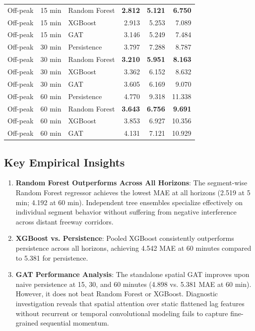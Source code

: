 \documentclass[conference]{IEEEtran}
\begin{document}
\begin{table}[htbp]
{\begin{tabular}{lllrrr}
Off-peak & 15 min & Random Forest & \textbf{2.812} & \textbf{5.121} & \textbf{6.750} \\
Off-peak & 15 min & XGBoost       & 2.913 & 5.253 & 7.089 \\
Off-peak & 15 min & GAT           & 3.146 & 5.249 & 7.484 \\
\midrule
Off-peak & 30 min & Persistence   & 3.797 & 7.288 & 8.787 \\
Off-peak & 30 min & Random Forest & \textbf{3.210} & \textbf{5.951} & \textbf{8.163} \\
Off-peak & 30 min & XGBoost       & 3.362 & 6.152 & 8.632 \\
Off-peak & 30 min & GAT           & 3.605 & 6.169 & 9.070 \\
\midrule
Off-peak & 60 min & Persistence   & 4.770 & 9.318 & 11.338 \\
Off-peak & 60 min & Random Forest & \textbf{3.643} & \textbf{6.756} & \textbf{9.691} \\
Off-peak & 60 min & XGBoost       & 3.853 & 6.927 & 10.356 \\
Off-peak & 60 min & GAT           & 4.131 & 7.121 & 10.929 \\
\bottomrule
\end{tabular}%
}
\end{table}

\subsection{Key Empirical Insights}
\begin{enumerate}
    \item \textbf{Random Forest Outperforms Across All Horizons}: The segment-wise Random Forest regressor achieves the lowest MAE at all horizons (2.519 at 5 min; 4.192 at 60 min). Independent tree ensembles specialize effectively on individual segment behavior without suffering from negative interference across distant freeway corridors.
    \item \textbf{XGBoost vs. Persistence}: Pooled XGBoost consistently outperforms persistence across all horizons, achieving 4.542 MAE at 60 minutes compared to 5.381 for persistence.
    \item \textbf{GAT Performance Analysis}: The standalone spatial GAT improves upon naive persistence at 15, 30, and 60 minutes (4.898 vs. 5.381 MAE at 60 min). However, it does not beat Random Forest or XGBoost. Diagnostic investigation reveals that spatial attention over static flattened lag features without recurrent or temporal convolutional modeling fails to capture fine-grained sequential momentum.
\end{enumerate}
\end{document}
